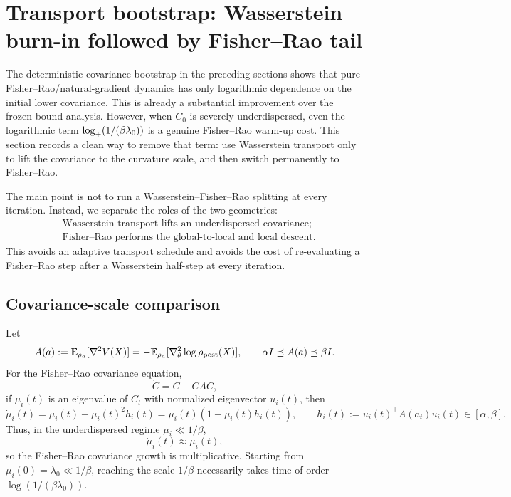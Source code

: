 \section{Transport bootstrap: Wasserstein burn-in followed by Fisher--Rao tail}
\label{sec:transport-bootstrap}

The deterministic covariance bootstrap in the preceding sections shows that pure
Fisher--Rao/natural-gradient dynamics has only logarithmic dependence on the initial lower
covariance. This is already a substantial improvement over the frozen-bound analysis. However,
when $C_0$ is severely underdispersed, even the logarithmic term
$\log_+(1/(\beta\lambda_0))$ is a genuine Fisher--Rao warm-up cost. This section records a
clean way to remove that term: use Wasserstein transport only to lift the covariance to the
curvature scale, and then switch permanently to Fisher--Rao.

The main point is not to run a Wasserstein--Fisher--Rao splitting at every iteration. Instead, we
separate the roles of the two geometries:
\[
    \boxed{
    \begin{aligned}
    &\text{Wasserstein transport lifts an underdispersed covariance;}\\
    &\text{Fisher--Rao performs the global-to-local and local descent.}
    \end{aligned}
    }
\]
This avoids an adaptive transport schedule and avoids the cost of re-evaluating a Fisher--Rao
step after a Wasserstein half-step at every iteration.

\subsection{Covariance-scale comparison}

Let
\[
    A(a):=\mathbb{E}_{\rho_a}[\nabla^2V(X)]
    =-\mathbb{E}_{\rho_a}[\nabla_\theta^2\log\rho_{\mathrm{post}}(X)],
    \qquad
    \alpha I\preceq A(a)\preceq\beta I.
\]
For the Fisher--Rao covariance equation,
\[
    \dot C=C-CAC,
\]
if $\mu_i(t)$ is an eigenvalue of $C_t$ with normalized eigenvector $u_i(t)$, then
\[
    \dot\mu_i(t)
    =\mu_i(t)-\mu_i(t)^2h_i(t)
    =\mu_i(t)(1-\mu_i(t)h_i(t)),
    \qquad
    h_i(t):=u_i(t)^\top A(a_t)u_i(t)\in[\alpha,\beta].
\]
Thus, in the underdispersed regime $\mu_i\ll1/\beta$,
\[
    \dot\mu_i(t)\approx \mu_i(t),
\]
so the Fisher--Rao covariance growth is multiplicative. Starting from
$\mu_i(0)=\lambda_0\ll1/\beta$, reaching the scale $1/\beta$ necessarily takes time of order
$\log(1/(\beta\lambda_0))$.

